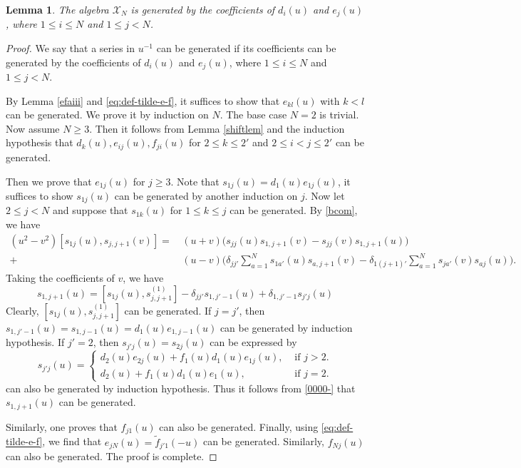 \documentclass[11pt,reqno]{amsart}
\numberwithin{equation}{section}
\newtheorem{lem}[thm]{Lemma}
\theoremstyle{definition}
\theoremstyle{remark}
\newcommand{\beq}{\begin{equation}}
\newcommand{\eeq}{\end{equation}}
\newcommand{\tl}{\tilde}
\newcommand{\gge}{\geqslant}
\newcommand{\lle}{\leqslant}
\newcommand{\scrX}{{\mathscr{X}}}
\begin{document}
\begin{lem}\label{lem:de-gen}
The algebra $\scrX_N$ is generated by the coefficients of $d_i(u)$ and $e_j(u)$, where $1\lle i\lle N$ and $1\lle j<N$.
\end{lem}
\begin{proof}
We say that a series in $u^{-1}$ can be generated if its coefficients can be generated by the coefficients of $d_i(u)$ and $e_j(u)$, where $1\lle i\lle N$ and $1\lle j<N$.

By Lemma \ref{efaiii} and \eqref{eq:def-tilde-e-f}, it suffices to show that $e_{kl}(u)$ with $k<l$ can be generated. We prove it by induction on $N$. The base case $N=2$ is trivial. Now assume $N\gge 3$. Then it follows from Lemma \ref{shiftlem} and the induction hypothesis that $d_{k}(u), e_{ij}(u), f_{ji}(u)$ for $2\lle k\lle 2'$ and $2\lle i<j\lle 2'$ can be generated.

Then we prove that $e_{1j}(u)$ for $j\gge 3$. Note that $s_{1j}(u)=d_1(u)e_{1j}(u)$, it suffices to show $s_{1j}(u)$ can be generated by another induction on $j$. Now let $2\lle j<N$ and suppose that $s_{1k}(u)$ for $1\lle k\lle j$ can be generated. By \eqref{bcom}, we have
\begin{align*}
(u^2-v^2)[s_{1j}(u),s_{j,j+1}(v)]=&\,(u+v)\big(s_{jj}(u)s_{1,j+1}(v)-s_{jj}(v)s_{1,j+1}(u)\big)\\
+& \, (u-v)\Big(\delta_{jj'}\sum_{a=1}^N s_{1a'}(u)s_{a,j+1}(v)-\delta_{1(j+1)'}\sum_{a=1}^N s_{ja'}(v)s_{aj}(u)\Big).
\end{align*}
Taking the coefficients of $v$, we have
\beq\label{0000-}
s_{1,j+1}(u)=[s_{1j}(u),s_{j,j+1}^{(1)}]-\delta_{jj'}s_{1,j'-1}(u)+\delta_{1,j'-1}s_{j'j}(u)
\eeq
Clearly, $[s_{1j}(u),s_{j,j+1}^{(1)}]$ can be generated. If $j=j'$, then $s_{1,j'-1}(u)=s_{1,j-1}(u)=d_1(u)e_{1,j-1}(u)$ can be generated by induction hypothesis. If $j'=2$, then $s_{j'j}(u)=s_{2j}(u)$ can be expressed by
\[
s_{j'j}(u)=\begin{cases}d_2(u)e_{2j}(u)+f_{1}(u)d_1(u)e_{1j}(u),&\text{ if }j> 2.\\
d_2(u)+f_{1}(u)d_1(u)e_{1}(u),  &\text{ if }j=2.
\end{cases}
\]
can also be generated by induction hypothesis. Thus it follows from \eqref{0000-} that $s_{1,j+1}(u)$ can be generated.

Similarly, one proves that $f_{j1}(u)$ can also be generated. Finally, using \eqref{eq:def-tilde-e-f}, we find that $e_{jN}(u)=\tl f_{j'1}(-u)$ can be generated. Similarly, $f_{Nj}(u)$ can also be generated. The proof is complete.
\end{proof}
\end{document}
